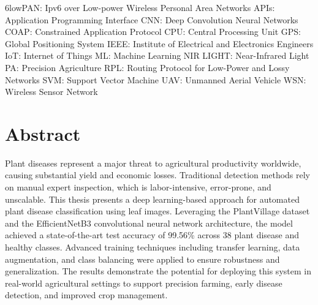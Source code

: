 \documentclass[12pt,a4paper]{report}
\begin{document}
\begin{List of Abbreviations}
    \centering
6lowPAN: Ipv6 over Low-power Wireless Personal Area Networks
APIs: Application Programming Interface
CNN: Deep Convolution Neural Networks 
 COAP: Constrained Application Protocol
CPU: Central Processing Unit 
GPS: Global Positioning System
IEEE: Institute of Electrical and Electronics Engineers
IoT: Internet of Things 
ML: Machine Learning
NIR LIGHT: Near-Infrared Light
PA: Precision Agriculture 
RPL: Routing Protocol for Low-Power and Lossy Networks 
SVM: Support Vector Machine
UAV: Unmanned Aerial Vehicle 
WSN: Wireless Sensor Network 

\chapter*{Abstract}
Plant diseases represent a major threat to agricultural productivity worldwide, causing substantial yield and economic losses. Traditional detection methods rely on manual expert inspection, which is labor-intensive, error-prone, and unscalable. This thesis presents a deep learning-based approach for automated plant disease classification using leaf images. Leveraging the PlantVillage dataset and the EfficientNetB3 convolutional neural network architecture, the model achieved a state-of-the-art test accuracy of 99.56\% across 38 plant disease and healthy classes. Advanced training techniques including transfer learning, data augmentation, and class balancing were applied to ensure robustness and generalization. The results demonstrate the potential for deploying this system in real-world agricultural settings to support precision farming, early disease detection, and improved crop management.


\end{List of Abbreviations}
\end{document}
